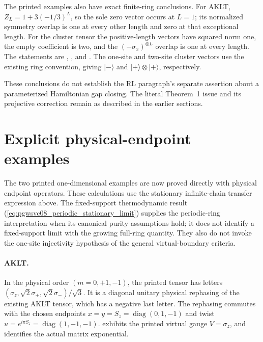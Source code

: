 \documentclass[11pt]{article}
\begin{document}
The printed examples also have exact finite-ring conclusions. For AKLT,
$Z_L=1+3(-1/3)^L$, so the sole zero vector occurs at $L=1$; its normalized
symmetry overlap is one at every other length and zero at that exceptional
length. For the cluster tensor the positive-length vectors have squared
norm one, the empty coefficient is two, and the $(-\sigma_x)^{\otimes L}$
overlap is one at every length. The statements are
,
, and
.
The one-site and two-site cluster vectors use the existing ring convention,
giving $|{-}\rangle$ and $|{+}\rangle\otimes|{+}\rangle$, respectively.

These conclusions do not establish the RL paragraph's separate assertion
about a parameterized Hamiltonian gap closing. The literal Theorem~1 issue and its projective correction remain
as described in the earlier sections.

\section{Explicit physical-endpoint examples}

The two printed one-dimensional examples are now proved directly with
physical endpoint operators. These calculations use the stationary
infinite-chain transfer expression above. The fixed-support thermodynamic
result (\ref{eq:pgwsvc08_periodic_stationary_limit}) supplies the periodic-ring
interpretation when its canonical purity assumptions hold; it does not
identify a fixed-support limit with the growing full-ring quantity. They also do not invoke the
one-site injectivity hypothesis of the general virtual-boundary criteria.

\paragraph{AKLT.}
In the physical order $(m=0,+1,-1)$, the printed tensor has letters
$(\sigma_z,\sqrt2\sigma_+,\sqrt2\sigma_-)/\sqrt3$. It is a diagonal unitary
physical rephasing of the existing AKLT tensor, which has a negative last
letter. The rephasing commutes with the chosen endpoints
$x=y=S_z=\operatorname{diag}(0,1,-1)$ and twist
$u=e^{i\pi S_z}=\operatorname{diag}(1,-1,-1)$.
 exhibits the printed virtual
gauge $V=\sigma_z$, and  identifies
the actual matrix exponential.
\end{document}
